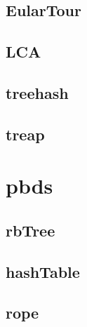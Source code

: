 \documentclass[a4paper,10pt,twocolumn,oneside]{article}
\begin{document}
    \subsection{EularTour}
    

    \subsection{LCA}
    

    \subsection{treehash}
    
   
    \subsection{treap}
    



\section{pbds}
    \subsection{rbTree}
    
    \subsection{hashTable}
    
    \subsection{rope}
    





\end{document}
